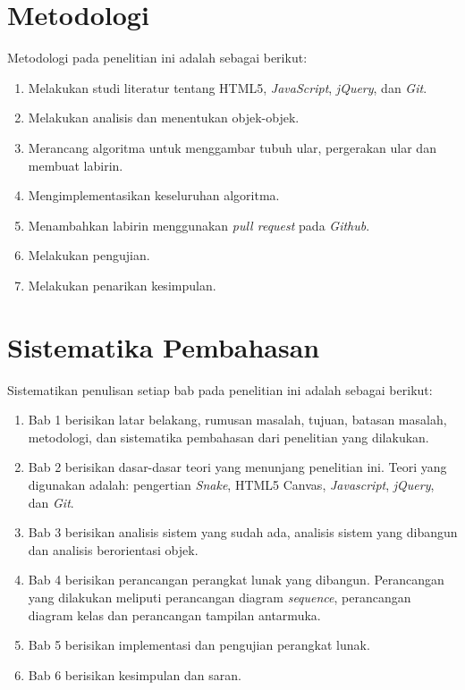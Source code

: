 \section{Metodologi}
\label{sec:metlit}
Metodologi pada penelitian ini adalah sebagai berikut:
\begin{enumerate}
	\item Melakukan studi literatur tentang HTML5, \textit{JavaScript}, \textit{jQuery}, dan \textit{Git}.
	\item Melakukan analisis dan menentukan objek-objek.
	\item Merancang algoritma untuk menggambar tubuh ular, pergerakan ular dan membuat labirin.
	\item Mengimplementasikan keseluruhan algoritma.
	\item Menambahkan labirin menggunakan \textit{pull request} pada \textit{Github}.
	\item Melakukan pengujian.
	\item Melakukan penarikan kesimpulan. 
\end{enumerate}


\section{Sistematika Pembahasan}
\label{sec:sispem}
Sistematikan penulisan setiap bab pada penelitian ini adalah sebagai berikut:
\begin{enumerate}
	\item Bab 1 berisikan latar belakang, rumusan masalah, tujuan, batasan masalah, metodologi, dan sistematika pembahasan dari penelitian yang dilakukan.
	\item Bab 2 berisikan dasar-dasar teori yang menunjang penelitian ini. Teori yang digunakan adalah: pengertian \textit{Snake}, HTML5 Canvas, \textit{Javascript}, \textit{jQuery}, dan \textit{Git}.
	\item Bab 3 berisikan analisis sistem yang sudah ada, analisis sistem yang dibangun dan analisis berorientasi objek.
	\item Bab 4 berisikan perancangan perangkat lunak yang dibangun. Perancangan yang dilakukan meliputi perancangan diagram \textit{sequence}, perancangan diagram kelas dan perancangan tampilan antarmuka.
	\item Bab 5 berisikan implementasi dan pengujian perangkat lunak.
	\item Bab 6 berisikan kesimpulan dan saran.
\end{enumerate}